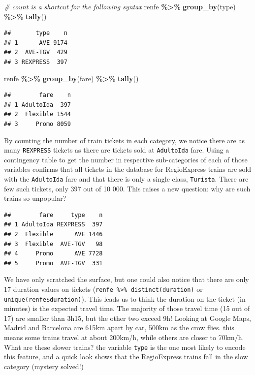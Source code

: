 \documentclass[
  11pt,
  letterpaper,
]{book}
\newenvironment{Shaded}{\begin{snugshade}}{\end{snugshade}}
\newcommand{\CommentTok}[1]{\textcolor[rgb]{0.56,0.35,0.01}{\textit{#1}}}
\newcommand{\KeywordTok}[1]{\textcolor[rgb]{0.13,0.29,0.53}{\textbf{#1}}}
\newcommand{\NormalTok}[1]{#1}
\newcommand{\OperatorTok}[1]{\textcolor[rgb]{0.81,0.36,0.00}{\textbf{#1}}}
\newcommand{\StringTok}[1]{\textcolor[rgb]{0.31,0.60,0.02}{#1}}
\theoremstyle{definition}
\theoremstyle{definition}
\theoremstyle{definition}
\theoremstyle{remark}
\begin{document}
\begin{Shaded}
\begin{Highlighting}[]
\CommentTok{\# \textasciigrave{}count\textasciigrave{} is a shortcut for the following syntax}
\NormalTok{renfe }\OperatorTok{\%\textgreater{}\%}\StringTok{ }\KeywordTok{group\_by}\NormalTok{(type) }\OperatorTok{\%\textgreater{}\%}\StringTok{ }\KeywordTok{tally}\NormalTok{()}
\end{Highlighting}
\end{Shaded}

\begin{verbatim}
##       type    n
## 1      AVE 9174
## 2  AVE-TGV  429
## 3 REXPRESS  397
\end{verbatim}

\begin{Shaded}
\begin{Highlighting}[]
\NormalTok{renfe }\OperatorTok{\%\textgreater{}\%}\StringTok{ }\KeywordTok{group\_by}\NormalTok{(fare) }\OperatorTok{\%\textgreater{}\%}\StringTok{ }\KeywordTok{tally}\NormalTok{()}
\end{Highlighting}
\end{Shaded}

\begin{verbatim}
##        fare    n
## 1 AdultoIda  397
## 2  Flexible 1544
## 3     Promo 8059
\end{verbatim}

By counting the number of train tickets in each category, we notice there are as many \texttt{REXPRESS} tickets as there are tickets sold at \texttt{AdultoIda} fare. Using a contingency table to get the number in respective sub-categories of each of those variables confirms that all tickets in the database for RegioExpress trains are sold with the \texttt{AdultoIda} fare and that there is only a single class, \texttt{Turista}. There are few such tickets, only 397 out of 10 000. This raises a new question: why are such trains so unpopular?

\begin{verbatim}
##        fare     type    n
## 1 AdultoIda REXPRESS  397
## 2  Flexible      AVE 1446
## 3  Flexible  AVE-TGV   98
## 4     Promo      AVE 7728
## 5     Promo  AVE-TGV  331
\end{verbatim}

We have only scratched the surface, but one could also notice that there are only 17 duration values on tickets (\texttt{renfe\ \%\textgreater{}\%\ distinct(duration)} or \texttt{unique(renfe\$duration)}). This leads us to think the duration on the ticket (in minutes) is the expected travel time. The majority of those travel time (15 out of 17) are smaller than 3h15, but the other two exceed 9h! Looking at Google Maps, Madrid and Barcelona are 615km apart by car, 500km as the crow flies. this means some trains travel at about 200km/h, while others are closer to 70km/h. What are these slower trains? the variable \texttt{type} is the one most likely to encode this feature, and a quick look shows that the RegioExpress trains fall in the slow category (mystery solved!)
\end{document}
